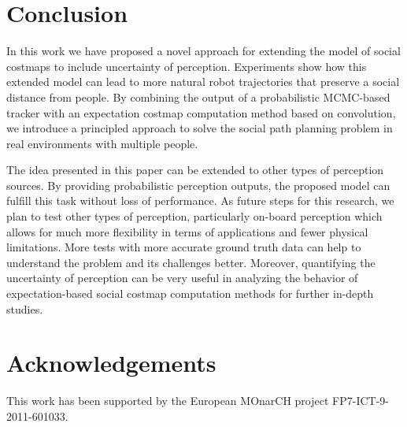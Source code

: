 \section{Conclusion}
\label{sec:conclusion}

In this work we have proposed a novel approach for extending the model of social costmaps to include uncertainty of perception. Experiments show how this extended model can lead to more natural robot trajectories that preserve a social distance from people. By combining the output of a probabilistic MCMC-based tracker with an expectation costmap computation method based on convolution, we introduce a principled approach to solve the social path planning problem in real environments with multiple people. 

The idea presented in this paper can be extended to other types of perception sources. By providing probabilistic perception outputs, the proposed model can fulfill this task without loss of performance. As future steps for this research, we plan to test other types of perception, particularly on-board perception which allows for much more flexibility in terms of applications and fewer physical limitations.
 More tests with more accurate ground truth data can help to understand the problem and its challenges better. Moreover, quantifying the uncertainty of perception can be very useful in analyzing the behavior of expectation-based social costmap computation methods for further in-depth studies.  


\section*{Acknowledgements}

This work has been supported by the European MOnarCH project FP7-ICT-9-2011-601033. 